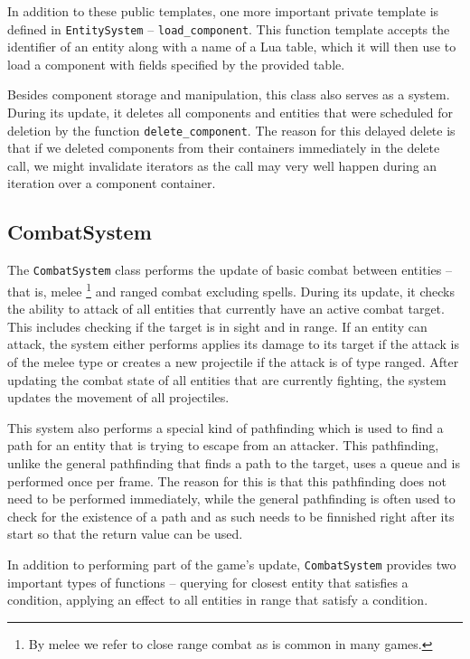 In addition to these public templates, one more important private template is defined in \texttt{EntitySystem} -- \texttt{load\_component}.
This function template accepts the identifier of an entity along with a name of a Lua table, which it will then use to load a component
with fields specified by the provided table.

Besides component storage and manipulation, this class also serves as a system. During its update, it deletes all components and entities
that were scheduled for deletion by the function \texttt{delete\_component}. The reason for this delayed delete is that if we deleted
components from their containers immediately in the delete call, we might invalidate iterators as the call may very well happen during
an iteration over a component container.

\subsection{CombatSystem}

The \texttt{CombatSystem} class performs the update of basic combat between entities -- that is, melee
\footnote{By melee we refer to close range combat as is common in many games.} and ranged combat excluding spells.
During its update, it checks the ability to attack of all entities that currently have an active combat target. This includes checking
if the target is in sight and in range. If an entity can attack, the system either performs applies its damage to its target if the
attack is of the melee type or creates a new projectile if the attack is of type ranged.
After updating the combat state of all entities that are currently fighting, the system updates the movement of all projectiles.

This system also performs a special kind of pathfinding which is used to find a path for an entity that is trying to escape from an attacker.
This pathfinding, unlike the general pathfinding that finds a path to the target, uses a queue and is performed once per frame. The reason for
this is that this pathfinding does not need to be performed immediately, while the general pathfinding is often used to check for the
existence of a path and as such needs to be finnished right after its start so that the return value can be used.

In addition to performing part of the game's update, \texttt{CombatSystem} provides two important types of functions -- querying for closest
entity that satisfies a condition, applying an effect to all entities in range that satisfy a condition.

